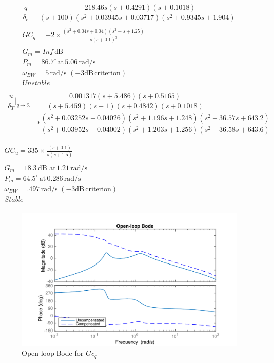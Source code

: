 \documentclass[12pt]{article}
\begin{document}
\begin{gather*}
\dfrac{q}{\delta_e} =\dfrac{-218.46 s (s+0.4291) (s+0.1018)} {(s+100) (s^2 + 0.03945s + 0.03717) (s^2 + 0.9345s + 1.904)} \\
\\
\boxed{GC_q = -2 \times \frac{(s^2 + 0.04s + 0.04) (s^2 + s + 1.25)}{s (s+0.1)^3}} \\
\\
G_m=Inf\,\mathrm{dB\,\,} \\
P_m=86.7^{\circ}\, \mathrm{at}\, 5.06 \,\mathrm{rad/s} \\
\omega_{BW}=5\, \mathrm{rad/s}\,\mathrm{\,(-3 dB\, criterion)}\\
Unstable \\
\end{gather*}
\begin{gather*}
\begin{split}
\dfrac{u}{\delta_T}\biggr\rvert_{q \rightarrow \delta_e} & = \dfrac{0.001317 (s+5.486) (s+0.5165)}{(s+5.459) (s+1) (s+0.4842) (s+0.1018)} \\
                                                         & * \dfrac{(s^2 + 0.03252s + 0.04026) (s^2 + 1.196s + 1.248) (s^2 + 36.57s + 643.2)}{(s^2 + 0.03952s + 0.04002) (s^2 + 1.203s + 1.256) (s^2 + 36.58s + 643.6)} \\
\end{split}\\
\\
\boxed{GC_{u} = 335 \times \frac{(s+0.1)}{s (s+1.5)}} \\
\\
G_m=18.3\,\mathrm{dB\,\,} \mathrm{at}\, 1.21 \,\mathrm{rad/s}  \\
P_m=64.5^{\circ}\, \mathrm{at}\, 0.286 \,\mathrm{rad/s} \\
\omega_{BW}=.497\, \mathrm{rad/s}\,\mathrm{\,(-3 dB\, criterion)}\\
Stable \\
\end{gather*}

\begin{figure}[h!]
\begin{center}
\includegraphics[width=.95\textwidth]{figures/openloop_gc1}
\caption{Open-loop Bode for $Gc_q$}
\end{center}
\end{figure}
\end{document}
